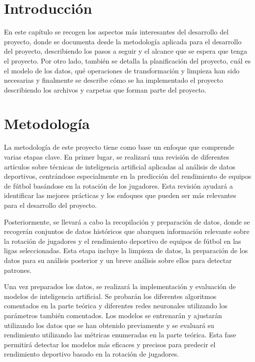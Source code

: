 


\section{Introducción}
En este capítulo se recogen los aspectos más interesantes del desarrollo del proyecto, donde se documenta desde la metodología aplicada para el desarrollo del proyecto, describiendo los pasos a seguir y el alcance que se espera que tenga el proyecto. Por otro lado, también se detalla la planificación del proyecto, cuál es el modelo de los datos, qué operaciones de transformación y limpieza han sido necesarias y finalmente se describe cómo se ha implementado el proyecto describiendo los archivos y carpetas que forman parte del proyecto.


\section{Metodología}
La metodología de este proyecto tiene como base un enfoque que comprende varias etapas clave. En primer lugar, se realizará una revisión de diferentes artículos sobre técnicas de inteligencia artificial aplicadas al análisis de datos deportivos, centrándose especialmente en la predicción del rendimiento de equipos de fútbol basándose en la rotación de los jugadores. Esta revisión ayudará a identificar las mejores prácticas y los enfoques que pueden ser más relevantes para el desarrollo del proyecto.

Posteriormente, se llevará a cabo la recopilación y preparación de datos, donde se recogerán conjuntos de datos históricos que abarquen información relevante sobre la rotación de jugadores y el rendimiento deportivo de equipos de fútbol en las ligas seleccionadas. Esta etapa incluye la limpieza de datos, la preparación de los datos para su análisis posterior y un breve análisis sobre ellos para detectar patrones.

Una vez preparados los datos, se realizará la implementación y evaluación de modelos de inteligencia artificial. Se probarán los diferentes algoritmos comentados en la parte teórica y diferentes redes neuronales utilizando los parámetros también comentados. Los modelos se entrenarán y ajustarán utilizando los datos que se han obtenido previamente y se evaluará su rendimiento utilizando las métricas enumeradas en la parte teórica. Esta fase permitirá detectar los modelos más eficaces y precisos para predecir el rendimiento deportivo basado en la rotación de jugadores.

